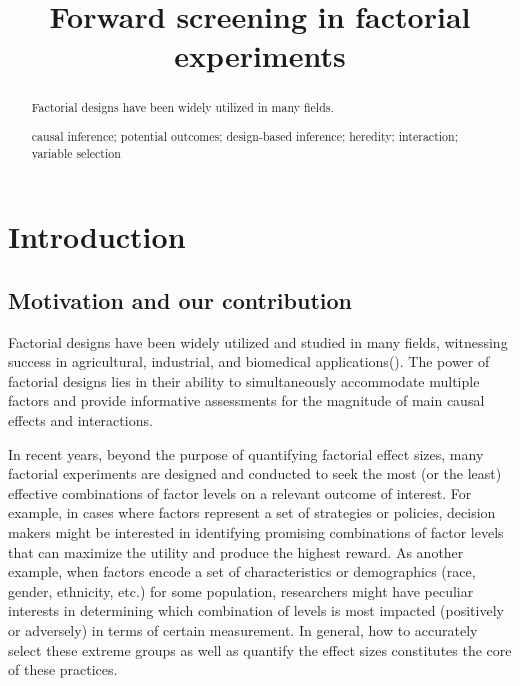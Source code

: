 \documentclass[12pt]{article}
\title{Forward screening in  factorial experiments}
\author{}
\date{}
\begin{document}
\maketitle

\begin{abstract}
    Factorial designs have been widely utilized in many fields.
    
      causal inference; potential outcomes; design-based inference; heredity; interaction; variable selection
\end{abstract}

\section{Introduction}
\subsection{Motivation and our contribution}


Factorial designs have been widely utilized and studied in many fields, witnessing success in agricultural, industrial, and biomedical applications(\cite{wu2011experiments, zhao2021regression, egami2018causal}). The power of factorial designs lies in their ability to simultaneously accommodate multiple factors and provide informative assessments for the magnitude of main causal effects and interactions. 

In recent years, beyond the purpose of quantifying factorial effect sizes, many factorial experiments are designed and conducted to seek the most (or the least) effective combinations of factor levels on a relevant outcome of interest. For example, in cases where factors represent a set of strategies or policies, decision makers might be interested in identifying promising combinations of factor levels that can maximize the utility and produce the highest reward. As another example, when factors encode a set of characteristics or demographics (race, gender, ethnicity, etc.) for some population, researchers might have peculiar interests in determining which combination of levels is most impacted (positively or adversely) in terms of certain measurement. In general, how to accurately select these extreme groups as well as quantify the effect sizes constitutes the core of these practices. 
\end{document}
